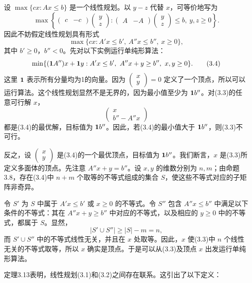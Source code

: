 设 $\max\{cx:Ax\le b\}$ 是一个线性规划。以 $y-z$ 代替 $x$，可等价地写为
\[
\max\left\{
\begin{pmatrix}c&-c\end{pmatrix}\begin{pmatrix}y\\z\end{pmatrix}:
\begin{pmatrix}A&-A\end{pmatrix}\begin{pmatrix}y\\z\end{pmatrix}\le b,\ y,z\ge0
\right\}.
\]
因此不妨假定线性规划具有形式
\begin{equation}
\max\{cx:A'x\le b',\ A''x\le b'',\ x\ge0\},\tag{3.3}
\end{equation}
其中 $b'\ge0$，$b''<0$。先对以下实例运行单纯形算法：
\begin{equation}
\min\{(\one A'')x+\one y:A'x\le b',\ A''x+y\ge b'',\ x,y\ge0\}.\tag{3.4}
\end{equation}
这里 $\mathbf1$ 表示所有分量均为1的向量。因为 $\begin{pmatrix}x\\y\end{pmatrix}=0$ 定义了一个顶点，所以可以运行算法。这个线性规划显然不是无界的，因为最小值至少为 $\mathbf1 b''$。对(3.3)的任意可行解 $x$，
\[
\begin{pmatrix}x\\b''-A''x\end{pmatrix}
\]
都是(3.4)的最优解，目标值为 $\mathbf1 b''$。因此，若(3.4)的最小值大于 $\mathbf1 b''$，则(3.3)不可行。

反之，设 $\begin{pmatrix}x\\y\end{pmatrix}$ 是(3.4)的一个最优顶点，目标值为 $\mathbf1 b''$。我们断言，$x$ 是(3.3)所定义多面体的顶点。先注意 $A''x+y=b''$。设 $x,y$ 的维数分别为 $n,m$；由命题3.8，存在(3.4)中 $n+m$ 个取等的不等式组成的集合 $S$，使这些不等式对应的子矩阵非奇异。

令 $S'$ 为 $S$ 中属于 $A'x\le b'$ 或 $x\ge0$ 的不等式。令 $S''$ 包含 $A''x\le b''$ 中满足以下条件的不等式：其在 $A''x+y\ge b''$ 中对应的不等式，以及相应的 $y\ge0$ 中的不等式，都属于 $S$。显然，
\[
|S'\cup S''|\ge |S|-m=n,
\]
而 $S'\cup S''$ 中的不等式线性无关，并且在 $x$ 处取等。因此，$x$ 使(3.3)中 $n$ 个线性无关的不等式取等，所以 $x$ 确实是顶点。于是可以从(3.3)及顶点 $x$ 出发运行单纯形算法。

定理3.13表明，线性规划(3.1)和(3.2)之间存在联系。这引出了以下定义：

